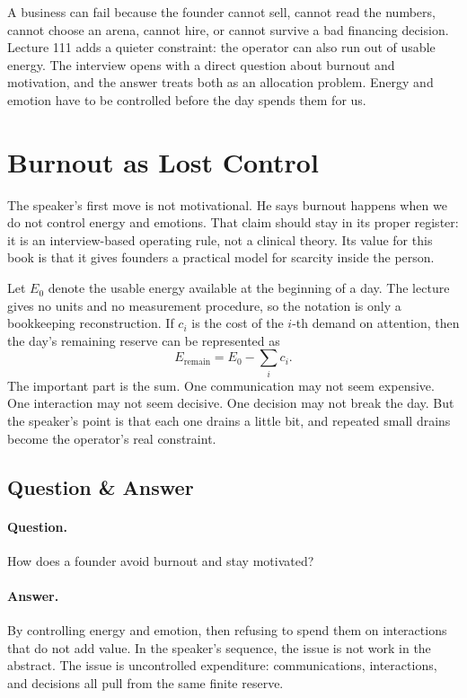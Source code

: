 \documentclass[11pt,oneside]{book}
\begin{document}
A business can fail because the founder cannot sell, cannot read the numbers, cannot choose an arena, cannot hire, or cannot survive a bad financing decision. Lecture 111 adds a quieter constraint: the operator can also run out of usable energy. The interview opens with a direct question about burnout and motivation, and the answer treats both as an allocation problem. Energy and emotion have to be controlled before the day spends them for us.

\section{Burnout as Lost Control}

The speaker's first move is not motivational. He says burnout happens when we do not control energy and emotions. That claim should stay in its proper register: it is an interview-based operating rule, not a clinical theory. Its value for this book is that it gives founders a practical model for scarcity inside the person.

Let \(E_0\) denote the usable energy available at the beginning of a day. The lecture gives no units and no measurement procedure, so the notation is only a bookkeeping reconstruction. If \(c_i\) is the cost of the \(i\)-th demand on attention, then the day's remaining reserve can be represented as
\[
E_{\mathrm{remain}}
=
E_0-\sum_i c_i.
\]
The important part is the sum. One communication may not seem expensive. One interaction may not seem decisive. One decision may not break the day. But the speaker's point is that each one drains a little bit, and repeated small drains become the operator's real constraint.

\subsection{Question \& Answer}

\paragraph{Question.}
How does a founder avoid burnout and stay motivated?

\paragraph{Answer.}
By controlling energy and emotion, then refusing to spend them on interactions that do not add value. In the speaker's sequence, the issue is not work in the abstract. The issue is uncontrolled expenditure: communications, interactions, and decisions all pull from the same finite reserve.
\end{document}
